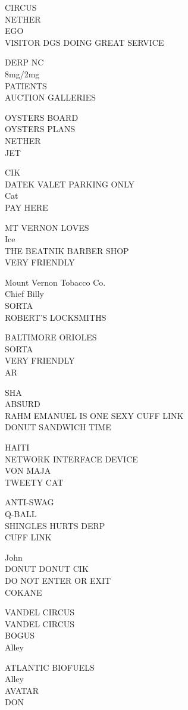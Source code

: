 \documentclass[10pt,letterpaper]{article}
\begin{document}
CIRCUS\\
NETHER\\
EGO\\
VISITOR DGS DOING GREAT SERVICE

DERP NC\\
8mg/2mg\\
PATIENTS\\
AUCTION GALLERIES

OYSTERS BOARD\\
OYSTERS PLANS\\
NETHER\\
JET

CIK\\
DATEK VALET PARKING ONLY\\
Cat\\
PAY HERE

MT VERNON LOVES\\
Ice\\
THE BEATNIK BARBER SHOP\\
VERY FRIENDLY

Mount Vernon Tobacco Co.\\
Chief Billy\\
SORTA\\
ROBERT'S LOCKSMITHS

BALTIMORE ORIOLES\\
SORTA\\
VERY FRIENDLY\\
AR

SHA\\
ABSURD\\
RAHM EMANUEL IS ONE SEXY CUFF LINK\\
DONUT SANDWICH TIME

HAITI\\
NETWORK INTERFACE DEVICE\\
VON MAJA\\
TWEETY CAT

ANTI{-}SWAG\\
Q{-}BALL\\
SHINGLES HURTS DERP\\
CUFF LINK

John\\
DONUT DONUT CIK\\
DO NOT ENTER OR EXIT\\
COKANE

VANDEL CIRCUS\\
VANDEL CIRCUS\\
BOGUS\\
Alley

ATLANTIC BIOFUELS\\
Alley\\
AVATAR\\
DON
\end{document}
